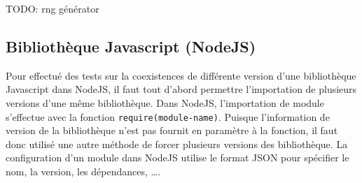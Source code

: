 TODO: rng générator










\subsection{Bibliothèque Javascript (NodeJS)}

Pour effectué des tests sur la coexistences de différente version d'une bibliothèque
Javascript dans NodeJS, il faut tout d'abord permettre l'importation de plusieurs
versions d'une même bibliothèque. Dans NodeJS, l'importation de module s'effectue
avec la fonction \verb|require(module-name)|. Puisque l'information de version
de la bibliothèque n'est pas fournit en paramètre à la fonction, il faut donc
utilisé une autre méthode de forcer plusieurs versions des bibliothèque.
La configuration d'un module dans NodeJS utilise le format JSON pour spécifier
le nom, la version, les dépendances, \dots.


